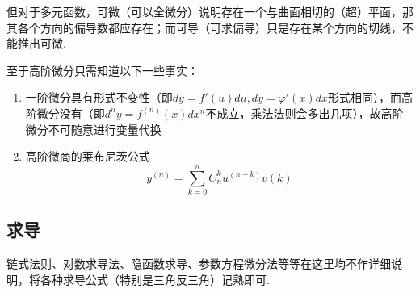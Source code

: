 \par 但对于多元函数，可微（可以全微分）说明存在一个与曲面相切的（超）平面，那其各个方向的偏导数都应存在；而可导（可求偏导）只是存在某个方向的切线，不能推出可微.
\par 至于高阶微分只需知道以下一些事实：
\begin{enumerate}
	\itemsep -3pt
	\item 一阶微分具有形式不变性（即$dy=f'(u)du,dy=\varphi'(x)dx$形式相同），而高阶微分没有（即$d^ny=f^{(n)}(x)dx^n$不成立，乘法法则会多出几项），故高阶微分不可随意进行变量代换
	\item 高阶微商的莱布尼茨公式
	\[y^{(n)}=\sum_{k=0}^nC_n^ku^{(n-k)}v{(k)}\]
\end{enumerate}

\subsection{求导}
链式法则、对数求导法、隐函数求导、参数方程微分法等等在这里均不作详细说明，将各种求导公式（特别是三角反三角）记熟即可.

